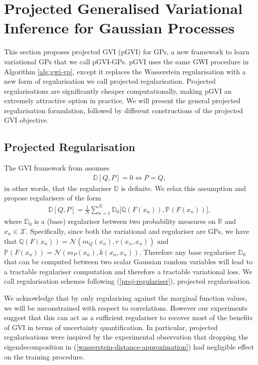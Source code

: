 \documentclass{article}
\numberwithin{equation}{section}
\begin{document}
\newpage
\section{Projected Generalised Variational Inference for Gaussian Processes}\label{section:pgvi}
This section proposes projected GVI (pGVI) for GPs, a new framework to learn variational GPs that we call pGVI-GPs.
pGVI uses the same GWI procedure in Algorithm \ref{alg:gwi-gp}, except it replaces the Wasserstein regularisation with a new form of regularisation we call projected regularisation.
Projected regularisations are significantly cheaper computationally, making pGVI an extremely attractive option in practice.
We will present the general projected regularisation formulation, followed by different constructions of the projected GVI objective.

\subsection{Projected Regularisation}
The GVI framework from \cite{knoblauch2022optimization} assumes
\begin{align}
    \mathbb{D}\left[Q, P\right] = 0 \Leftrightarrow P = Q,
\end{align}
in other words, that the regulariser $\mathbb{D}$ is definite.
We relax this assumption and propose regularisers of the form
\begin{align}
    \mathbb{D}\left[Q, P\right] = \frac{1}{N}\sum_{{n}=1}^{N} \mathbb{D}_0 \Big[\mathbb{Q}\left(F(x_n)\right), \mathbb{P}\left(F(x_n)\right)\Big],
    \label{proj-regulariser}
\end{align}
where $\mathbb{D}_0$ is a (base) regulariser between two probability measures on $\mathbb{R}$ and $x_n \in \mathcal{X}$.
Specifically, since both the variational and regulariser are GPs, we have that $\mathbb{Q}\left(F(x_n)\right) = \mathcal{N}\left(m_Q(x_n), r(x_n, x_n)\right)$ and $\mathbb{P}\left(F(x_n)\right) = \mathcal{N}\left(m_P(x_n), k(x_n, x_n)\right)$.
Therefore any base regulariser $\mathbb{D}_0$ that can be computed between two scalar Gaussian random variables will lead to a tractable regulariser computation and therefore a tractable variational loss. We call regularisation schemes following (\ref{proj-regulariser}), projected regularisation.

We acknowledge that by only regularising against the marginal function values, we will be unconstrained with respect to correlations.
However our experiments suggest that this can act as a  sufficient regulariser to recover most of the benefits of GVI in terms of uncertainty quantification. 
In particular, projected regularisations were inspired by the experimental observation that dropping the  eigendecomposition in (\ref{wasserstein-distance-approximation}) had negligible effect on the training procedure.
\end{document}
